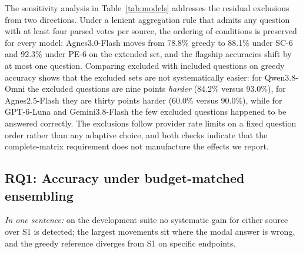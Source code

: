 The sensitivity analysis in Table~\ref{tab:models} addresses the residual exclusions from two directions. Under a lenient aggregation rule that admits any question with at least four parsed votes per source, the ordering of conditions is preserved for every model: Agnes3.0-Flash moves from 78.8\% greedy to 88.1\% under SC-6 and 92.3\% under PE-6 on the extended set, and the flagship accuracies shift by at most one question. Comparing excluded with included questions on greedy accuracy shows that the excluded sets are not systematically easier: for Qwen3.8-Omni the excluded questions are nine points \emph{harder} (84.2\% versus 93.0\%), for Agnes2.5-Flash they are thirty points harder (60.0\% versus 90.0\%), while for GPT-6-Luna and Gemini3.8-Flash the few excluded questions happened to be answered correctly. The exclusions follow provider rate limits on a fixed question order rather than any adaptive choice, and both checks indicate that the complete-matrix requirement does not manufacture the effects we report.

\subsection{RQ1: Accuracy under budget-matched ensembling}
\label{app:rq1}
\label{sec:rq1}

\emph{In one sentence:} on the development suite no systematic gain for either source over S1 is detected; the largest movements sit where the modal answer is wrong, and the greedy reference diverges from S1 on specific endpoints.

